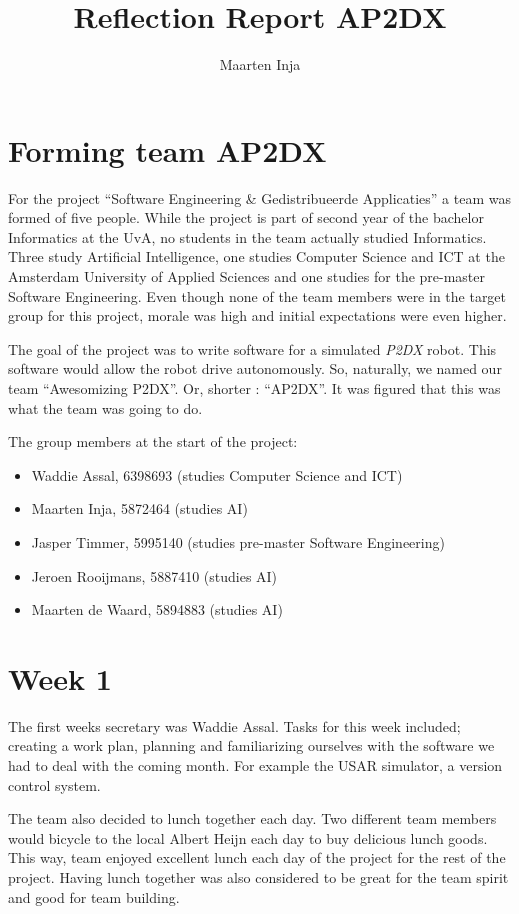 \documentclass[a4paper,10pt]{article}
\title{Reflection Report AP2DX}
\author{Maarten Inja}
\begin{document}
\maketitle

\section{Forming team AP2DX}
For the project ``Software Engineering \& Gedistribueerde Applicaties'' a team was formed of five people. 
While the project is part of second year of the bachelor Informatics at the UvA, no students in the 
team actually studied Informatics. Three study Artificial Intelligence, one studies 
Computer Science and ICT at the Amsterdam University of Applied Sciences and one studies for the 
pre-master Software Engineering. Even though none of the team members were in the target group for this
project, morale was high and initial expectations were even higher.

The goal of the project was to write software for a simulated \emph{P2DX} robot. This software would
allow the robot drive autonomously. So, naturally, we named our team ``Awesomizing P2DX''. Or, shorter
: ``AP2DX''. It was
figured that this was what the team was going to do. 

The group members at the start of the project:
\begin{itemize}
    \item Waddie Assal, 6398693 (studies Computer Science and ICT) 
    \item Maarten Inja, 5872464 (studies AI)
    \item Jasper Timmer, 5995140 (studies pre-master Software Engineering)
    \item Jeroen Rooijmans, 5887410 (studies AI)
    \item Maarten de Waard, 5894883 (studies AI)
\end{itemize}

\section{Week 1}
The first weeks secretary was Waddie Assal. Tasks for this week included; creating a work plan, planning
and familiarizing ourselves with the software we had to deal with the coming month. For example the USAR simulator, 
a version control system. 

The team also decided to lunch together each day. Two different team members would bicycle to
the local Albert Heijn each day to buy delicious lunch goods. This way, team enjoyed excellent lunch
each day of the project for the rest of the project. Having lunch together was also considered to be great for the team spirit and good
for team building.
\end{document}
